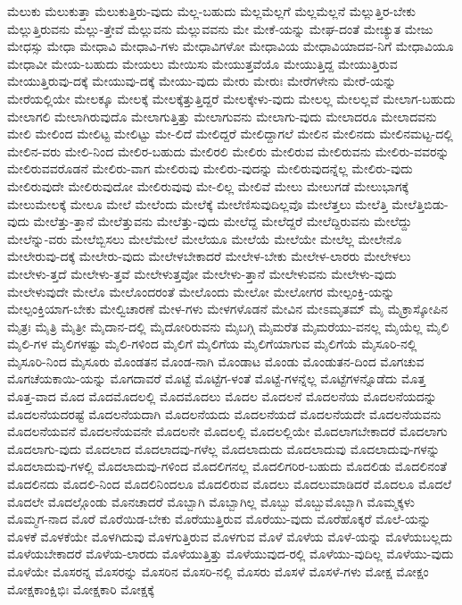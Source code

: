 {ಮೆಲುಕು
ಮೆಲುಕುತ್ತಾ
ಮೆಲುಕುತ್ತಿರು-ವುದು
ಮೆಲ್ಲ-ಬಹುದು
ಮೆಲ್ಲಮೆಲ್ಲಗೆ
ಮೆಲ್ಲಮೆಲ್ಲನೆ
ಮೆಲ್ಲುತ್ತಿರ-ಬೇಕು
ಮೆಲ್ಲುತ್ತಿರುವನು
ಮೆಲ್ಲು-ತ್ತೇವೆ
ಮೆಲ್ಲುವನು
ಮೆಲ್ಲುವವನು
ಮೇ
ಮೇಕೆ-ಯನ್ನು
ಮೇಘ-ದಂತೆ
ಮೇಚ್ಯುತ
ಮೇಜು
ಮೇಧಸ್ಸು
ಮೇಧಾ
ಮೇಧಾವಿ
ಮೇಧಾವಿ-ಗಳು
ಮೇಧಾವಿಗಳೋ
ಮೇಧಾವಿಯ
ಮೇಧಾವಿಯಾದವ-ನಿಗೆ
ಮೇಧಾವಿಯೂ
ಮೇಧಾವೀ
ಮೇಯ-ಬಹುದು
ಮೇಯಲು
ಮೇಯಿಸು
ಮೇಯುತ್ತವೆಯೊ
ಮೇಯುತ್ತಿದ್ದ
ಮೇಯುತ್ತಿರುವ
ಮೇಯುತ್ತಿರುವು-ದಕ್ಕೆ
ಮೇಯುವು-ದಕ್ಕೆ
ಮೇಯು-ವುದು
ಮೇರು
ಮೇರುಃ
ಮೇರೆಗಳೇನು
ಮೇರೆ-ಯನ್ನು
ಮೇರೆಯಲ್ಲಿಯೇ
ಮೇಲಕ್ಕೂ
ಮೇಲಕ್ಕೆ
ಮೇಲಕ್ಕೆತ್ತುತ್ತಿದ್ದರೆ
ಮೇಲಕ್ಕೇಳು-ವುದು
ಮೇಲಲ್ಲ
ಮೇಲಲ್ಲವೆ
ಮೇಲಾಗ-ಬಹುದು
ಮೇಲಾಗಲಿ
ಮೇಲಾಗಿರುವುದೊ
ಮೇಲಾಗುತ್ತಿತ್ತು
ಮೇಲಾಗುವನು
ಮೇಲಾಗು-ವುದು
ಮೇಲಾದರೂ
ಮೇಲಾದವನು
ಮೇಲಿ
ಮೇಲಿಂದ
ಮೇಲಿಟ್ಟ
ಮೇಲಿಟ್ಟು
ಮೇ-ಲಿದೆ
ಮೇಲಿದ್ದರೆ
ಮೇಲಿದ್ದಾಗಲೆ
ಮೇಲಿನ
ಮೇಲಿನದು
ಮೇಲಿನಮಟ್ಟ-ದಲ್ಲಿ
ಮೇಲಿನ-ವರು
ಮೇಲಿ-ನಿಂದ
ಮೇಲಿರ-ಬಹುದು
ಮೇಲಿರಲಿ
ಮೇಲಿರು
ಮೇಲಿರುವ
ಮೇಲಿರುವನು
ಮೇಲಿರು-ವವರನ್ನು
ಮೇಲಿರುವವರೊಡನೆ
ಮೇಲಿರು-ವಾಗ
ಮೇಲಿರುವು
ಮೇಲಿರು-ವುದನ್ನು
ಮೇಲಿರುವುದನ್ನೆಲ್ಲ
ಮೇಲಿರು-ವುದು
ಮೇಲಿರುವುದೇ
ಮೇಲಿರುವುದೋ
ಮೇಲಿರುವುವು
ಮೇ-ಲಿಲ್ಲ
ಮೇಲಿವೆ
ಮೇಲು
ಮೇಲುಗಡೆ
ಮೇಲುಭಾಗಕ್ಕೆ
ಮೇಲುಮೇಲಕ್ಕೆ
ಮೇಲೂ
ಮೇಲೆ
ಮೇಲೆಂದು
ಮೇಲೆಕ್ಕೆ
ಮೇಲೆಣಿಸುವುದಿಲ್ಲವೊ
ಮೇಲೆತ್ತಲು
ಮೇಲೆತ್ತಿ
ಮೇಲೆತ್ತಿಬಿಡು-ವುದು
ಮೇಲೆತ್ತು-ತ್ತಾನೆ
ಮೇಲೆತ್ತುವನು
ಮೇಲೆತ್ತು-ವುದು
ಮೇಲೆದ್ದ
ಮೇಲೆದ್ದರೆ
ಮೇಲೆದ್ದಿರುವನು
ಮೇಲೆದ್ದು
ಮೇಲೆನ್ನು-ವರು
ಮೇಲೆಬ್ಬಿಸಲು
ಮೇಲೆಮೇಲೆ
ಮೇಲೆಯೂ
ಮೇಲೆಯೆ
ಮೇಲೆಯೇ
ಮೇಲೆಲ್ಲ
ಮೇಲೇನೊ
ಮೇಲೇರುವು-ದಕ್ಕೆ
ಮೇಲೇರು-ವುದು
ಮೇಲೇಳಬೇಕಾದರೆ
ಮೇಲೇಳ-ಬೇಕು
ಮೇಲೇಳ-ಲಾರರು
ಮೇಲೇಳಲು
ಮೇಲೇಳು-ತ್ತದೆ
ಮೇಲೇಳು-ತ್ತವೆ
ಮೇಲೇಳುತ್ತವೋ
ಮೇಲೇಳು-ತ್ತಾನೆ
ಮೇಲೇಳುವನು
ಮೇಲೇಳು-ವುದು
ಮೇಲೇಳುವುದೇ
ಮೇಲೊ
ಮೇಲೊಂದರಂತೆ
ಮೇಲೊಂದು
ಮೇಲೋ
ಮೇಲೋಗರ
ಮೇಲ್ಪಂಕ್ತಿ-ಯನ್ನು
ಮೇಲ್ಪಂಕ್ತಿಯಾಗ-ಬೇಕು
ಮೇಲ್ವಿಚಾರಣೆ
ಮೇಳ-ಗಳು
ಮೇಳಗಳೊಡನೆ
ಮೇವಿನ
ಮೇಽಮೃತಮ್
ಮೈ
ಮೈಕ್ರಾಸ್ಕೋಪಿನ
ಮೈತ್ರಃ
ಮೈತ್ರಿ
ಮೈತ್ರೀ
ಮೈದಾನ-ದಲ್ಲಿ
ಮೈದೋರಿರುವನು
ಮೈಬಗ್ಗಿ
ಮೈಮರೆತ
ಮೈಮರೆಯು-ವನಲ್ಲ
ಮೈಯೆಲ್ಲ
ಮೈಲಿ
ಮೈಲಿ-ಗಳ
ಮೈಲಿಗಳಷ್ಟು
ಮೈಲಿ-ಗಳಿಂದ
ಮೈಲಿಗೆ
ಮೈಲಿಗೆಯ
ಮೈಲಿಗೆಯಾಗುವ
ಮೈಲಿಗೆಯೆ
ಮೈಸೂರಿ-ನಲ್ಲಿ
ಮೈಸೂರಿ-ನಿಂದ
ಮೈಸೂರು
ಮೊಂಡತನ
ಮೊಂಡ-ನಾಗಿ
ಮೊಂಡಾಟ
ಮೊಂಡು
ಮೊಂಡುತನ-ದಿಂದ
ಮೊಗಚುವ
ಮೊಗಚೆಯಕಾಯಿ-ಯನ್ನು
ಮೊಗದಾವರೆ
ಮೊಟ್ಟೆ
ಮೊಟ್ಟೆಗ-ಳಂತೆ
ಮೊಟ್ಟೆ-ಗಳನ್ನೆಲ್ಲ
ಮೊಟ್ಟೆಗಳನ್ನೊಡೆದು
ಮೊತ್ತ
ಮೊತ್ತ-ವಾದ
ಮೊದ
ಮೊದಮೊದಲಲ್ಲಿ
ಮೊದಮೊದಲು
ಮೊದಲ
ಮೊದಲನೆ
ಮೊದಲನೆಯ
ಮೊದಲನೆಯದನ್ನು
ಮೊದಲನೆಯದರಷ್ಟೆ
ಮೊದಲನೆಯದಾಗಿ
ಮೊದಲನೆಯದು
ಮೊದಲನೆಯದೆ
ಮೊದಲನೆಯದೇ
ಮೊದಲನೆಯವನು
ಮೊದಲನೆಯವನೆ
ಮೊದಲನೆಯವನೇ
ಮೊದಲನೇ
ಮೊದಲಲ್ಲಿ
ಮೊದಲಲ್ಲಿಯೇ
ಮೊದಲಾಗಬೇಕಾದರೆ
ಮೊದಲಾಗು
ಮೊದಲಾಗು-ವುದು
ಮೊದಲಾದ
ಮೊದಲಾದವು-ಗಳೆಲ್ಲ
ಮೊದಲಾದುದು
ಮೊದಲಾದುವು
ಮೊದಲಾದುವು-ಗಳನ್ನು
ಮೊದಲಾದುವು-ಗಳಲ್ಲಿ
ಮೊದಲಾದುವು-ಗಳಿಂದ
ಮೊದಲಿಗನಲ್ಲ
ಮೊದಲಿಗರಿರ-ಬಹುದು
ಮೊದಲಿಡು
ಮೊದಲಿನಂತೆ
ಮೊದಲಿನದು
ಮೊದಲಿ-ನಿಂದ
ಮೊದಲಿನಿಂದಲೂ
ಮೊದಲಿರುವ
ಮೊದಲು
ಮೊದಲುಮಾಡಿದರೆ
ಮೊದಲೂ
ಮೊದಲೆ
ಮೊದಲೇ
ಮೊದಲ್ಗೊಂಡು
ಮೊನಚಾದರೆ
ಮೊಬ್ಬಾಗಿ
ಮೊಬ್ಬಾಗಿಲ್ಲ
ಮೊಬ್ಬು
ಮೊಬ್ಬುಮೊಬ್ಬಾಗಿ
ಮೊಮ್ಮಕ್ಕಳು
ಮೊಮ್ಮಗ-ನಾದ
ಮೊರೆ
ಮೊರೆಯಿಡ-ಬೇಕು
ಮೊರೆಯುತ್ತಿರುವ
ಮೊರೆಯು-ವುದು
ಮೊರೆಹೊಕ್ಕರೆ
ಮೊಲೆ-ಯನ್ನು
ಮೊಳಕೆ
ಮೊಳಕೆಯೇ
ಮೊಳಗಿದುವು
ಮೊಳಗುತ್ತಿರುವ
ಮೊಳಗುವ
ಮೊಳೆ
ಮೊಳೆಯ
ಮೊಳೆ-ಯನ್ನು
ಮೊಳೆಯಬಲ್ಲದು
ಮೊಳೆಯಬೇಕಾದರೆ
ಮೊಳೆಯ-ಲಾರದು
ಮೊಳೆಯುತ್ತಿತ್ತು
ಮೊಳೆಯುವುದ-ರಲ್ಲಿ
ಮೊಳೆಯು-ವುದಿಲ್ಲ
ಮೊಳೆಯು-ವುದು
ಮೊಳೆಯೇ
ಮೊಸರನ್ನ
ಮೊಸರನ್ನು
ಮೊಸರಿನ
ಮೊಸರಿ-ನಲ್ಲಿ
ಮೊಸರು
ಮೊಸಳೆ
ಮೊಸಳೆ-ಗಳು
ಮೋಕ್ಷ
ಮೋಕ್ಷಂ
ಮೋಕ್ಷಕಾಂಕ್ಷಿಭಿಃ
ಮೋಕ್ಷಕಾರಿ
ಮೋಕ್ಷಕ್ಕೆ
}
